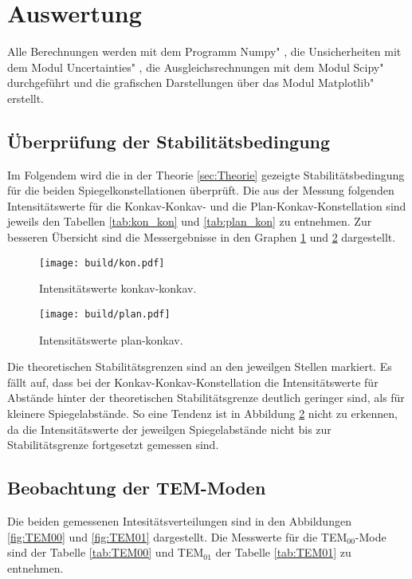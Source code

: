 \section{Auswertung}
\label{sec:Auswertung}
Alle Berechnungen werden mit dem Programm \glqq Numpy" \cite{numpy}, die Unsicherheiten mit dem Modul \glqq Uncertainties" \cite{uncertainties}, die Ausgleichsrechnungen mit dem Modul \glqq Scipy" \cite{scipy} durchgeführt und die grafischen Darstellungen über das Modul \glqq Matplotlib" \cite{matplotlib} erstellt.

\subsection{Überprüfung der Stabilitätsbedingung}

Im Folgendem wird die in der Theorie \ref{sec:Theorie} gezeigte Stabilitätsbedingung für die beiden Spiegelkonstellationen überprüft.
Die aus der Messung folgenden Intensitätswerte für die Konkav-Konkav- und die Plan-Konkav-Konstellation sind jeweils den Tabellen \ref{tab:kon_kon} und \ref{tab:plan_kon} zu entnehmen. 
Zur besseren Übersicht sind die Messergebnisse in den Graphen \ref{fig:kon} und \ref{fig:plan} dargestellt. 

\begin{figure}
    \centering
    \texttt{[image: build/kon.pdf]}
    \caption{Intensitätswerte konkav-konkav.}
    \label{fig:kon}
\end{figure}

\begin{figure}
    \centering
    \texttt{[image: build/plan.pdf]}
    \caption{Intensitätswerte plan-konkav.}
    \label{fig:plan}
\end{figure}

Die theoretischen Stabilitätsgrenzen sind an den jeweilgen Stellen markiert. 
Es fällt auf, dass bei der Konkav-Konkav-Konstellation die Intensitätswerte für Abstände hinter der theoretischen Stabilitätsgrenze deutlich geringer sind, als für kleinere Spiegelabstände. 
So eine Tendenz ist in Abbildung \ref{fig:plan} nicht zu erkennen, da die Intensitätswerte der jeweilgen Spiegelabstände nicht bis zur Stabilitätsgrenze fortgesetzt gemessen sind. 


\subsection{Beobachtung der TEM-Moden}
 
Die beiden gemessenen Intesitätsverteilungen sind in den Abbildungen \ref{fig:TEM00} und \ref{fig:TEM01} dargestellt. Die Messwerte für die TEM$_{00}$-Mode sind der Tabelle \ref{tab:TEM00} und TEM$_{01}$ der Tabelle \ref{tab:TEM01} zu entnehmen.


